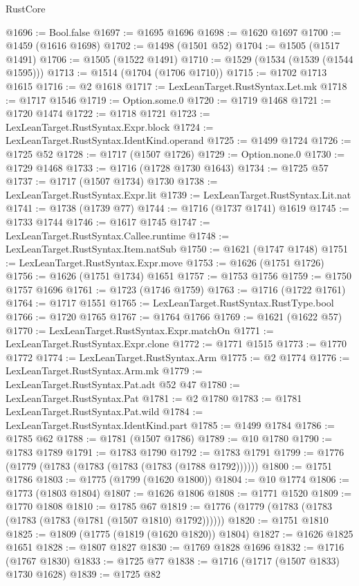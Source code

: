 \begin{lexlean}{RustCore}
\begin{coremodule}
@1696 := Bool.false
@1697 := @1695 @1696
@1698 := @1620 @1697
@1700 := @1459 (@1616 @1698)
@1702 := @1498 (@1501 @52)
@1704 := @1505 (@1517 @1491)
@1706 := @1505 (@1522 @1491)
@1710 := @1529 (@1534 (@1539 (@1544 @1595)))
@1713 := @1514 (@1704 (@1706 @1710))
@1715 := @1702 @1713 @1615
@1716 := @2 @1618
@1717 := LexLeanTarget.RustSyntax.Let.mk
@1718 := @1717 @1546
@1719 := Option.some.{0}
@1720 := @1719 @1468
@1721 := @1720 @1474
@1722 := @1718 @1721
@1723 := LexLeanTarget.RustSyntax.Expr.block
@1724 := LexLeanTarget.RustSyntax.IdentKind.operand
@1725 := @1499 @1724
@1726 := @1725 @52
@1728 := @1717 (@1507 @1726)
@1729 := Option.none.{0}
@1730 := @1729 @1468
@1733 := @1716 (@1728 @1730 @1643)
@1734 := @1725 @57
@1737 := @1717 (@1507 @1734) @1730
@1738 := LexLeanTarget.RustSyntax.Expr.lit
@1739 := LexLeanTarget.RustSyntax.Lit.nat
@1741 := @1738 (@1739 @77)
@1744 := @1716 (@1737 @1741) @1619
@1745 := @1733 @1744
@1746 := @1617 @1745
@1747 := LexLeanTarget.RustSyntax.Callee.runtime
@1748 := LexLeanTarget.RustSyntax.Item.natSub
@1750 := @1621 (@1747 @1748)
@1751 := LexLeanTarget.RustSyntax.Expr.move
@1753 := @1626 (@1751 @1726)
@1756 := @1626 (@1751 @1734) @1651
@1757 := @1753 @1756
@1759 := @1750 @1757 @1696
@1761 := @1723 (@1746 @1759)
@1763 := @1716 (@1722 @1761)
@1764 := @1717 @1551
@1765 := LexLeanTarget.RustSyntax.RustType.bool
@1766 := @1720 @1765
@1767 := @1764 @1766
@1769 := @1621 (@1622 @57)
@1770 := LexLeanTarget.RustSyntax.Expr.matchOn
@1771 := LexLeanTarget.RustSyntax.Expr.clone
@1772 := @1771 @1515
@1773 := @1770 @1772
@1774 := LexLeanTarget.RustSyntax.Arm
@1775 := @2 @1774
@1776 := LexLeanTarget.RustSyntax.Arm.mk
@1779 := LexLeanTarget.RustSyntax.Pat.adt @52 @47
@1780 := LexLeanTarget.RustSyntax.Pat
@1781 := @2 @1780
@1783 := @1781 LexLeanTarget.RustSyntax.Pat.wild
@1784 := LexLeanTarget.RustSyntax.IdentKind.part
@1785 := @1499 @1784
@1786 := @1785 @62
@1788 := @1781 (@1507 @1786)
@1789 := @10 @1780
@1790 := @1783 @1789
@1791 := @1783 @1790
@1792 := @1783 @1791
@1799 := @1776 (@1779 (@1783 (@1783 (@1783 (@1783 (@1788 @1792))))))
@1800 := @1751 @1786
@1803 := @1775 (@1799 (@1620 @1800))
@1804 := @10 @1774
@1806 := @1773 (@1803 @1804)
@1807 := @1626 @1806
@1808 := @1771 @1520
@1809 := @1770 @1808
@1810 := @1785 @67
@1819 := @1776 (@1779 (@1783 (@1783 (@1783 (@1783 (@1781 (@1507 @1810) @1792))))))
@1820 := @1751 @1810
@1825 := @1809 (@1775 (@1819 (@1620 @1820)) @1804)
@1827 := @1626 @1825 @1651
@1828 := @1807 @1827
@1830 := @1769 @1828 @1696
@1832 := @1716 (@1767 @1830)
@1833 := @1725 @77
@1838 := @1716 (@1717 (@1507 @1833) @1730 @1628)
@1839 := @1725 @82

\end{coremodule}
\end{lexlean}
